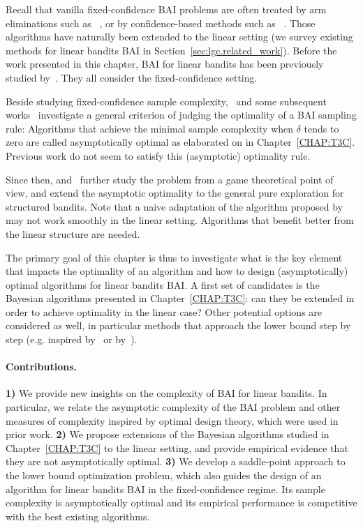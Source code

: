 Recall that vanilla fixed-confidence BAI problems are often treated by arm eliminations such as \SE~\citep{karnin2013sha}, or by confidence-based methods such as \UGapE~\citep{gabillon2012ugape}. Those algorithms have naturally been extended to the linear setting (we survey existing methods for linear bandits BAI in Section~\ref{sec:lgc.related_work}). Before the work presented in this chapter, BAI for linear bandits has been previously studied by~\cite{soare2014linear,tao2018alba,xu2018linear,zaki2019maxoverlap,fiez2019transductive,kazerouni2019glb}. They all consider the fixed-confidence setting.

Beside studying fixed-confidence sample complexity,~\citet{garivier2016tracknstop} and some subsequent works~\citep{qin2017ttei,shang2020t3c} investigate a general criterion of judging the optimality of a BAI sampling rule: Algorithms that achieve the minimal sample complexity when $\delta$ tends to zero are called asymptotically optimal as elaborated on in Chapter~\ref{CHAP:T3C}. Previous work do not seem to satisfy this (asymptotic) optimality rule.

Since then, \citet{menard2019lma} and~\citet{degenne2019game} further study the problem from a game theoretical point of view, and extend the asymptotic optimality to the general pure exploration for structured bandits. Note that a naive adaptation of the algorithm proposed by~\cite{degenne2019game} may not work smoothly in the linear setting. Algorithms that benefit better from the linear structure are needed.

The primary goal of this chapter is thus to investigate what is the key element that impacts the optimality of an algorithm and how to design (asymptotically) optimal algorithms for linear bandits BAI. A first set of candidates is the Bayesian algorithms presented in Chapter~\ref{CHAP:T3C}: can they be extended in order to achieve optimality in the linear case? Other potential options are considered as well, in particular methods that approach the lower bound step by step (e.g. inspired by~\citealt{garivier2016tracknstop} or by~\cite{degenne2019game}).

\paragraph{Contributions.}
\textbf{1)}
We provide new insights on the complexity of BAI for linear bandits. In particular, we relate the asymptotic complexity of the BAI problem and other measures of complexity inspired by optimal design theory, which were used in prior work.
\textbf{2)}
We propose extensions of the Bayesian algorithms studied in Chapter~\ref{CHAP:T3C} to the linear setting, and provide empirical evidence that they are not asymptotically optimal.
\textbf{3)}
We develop a saddle-point approach to the lower bound optimization problem, which also guides the design of an algorithm \LG{} for linear bandits BAI in the fixed-confidence regime. Its sample complexity is asymptotically optimal and its empirical performance is competitive with the best existing algorithms.

